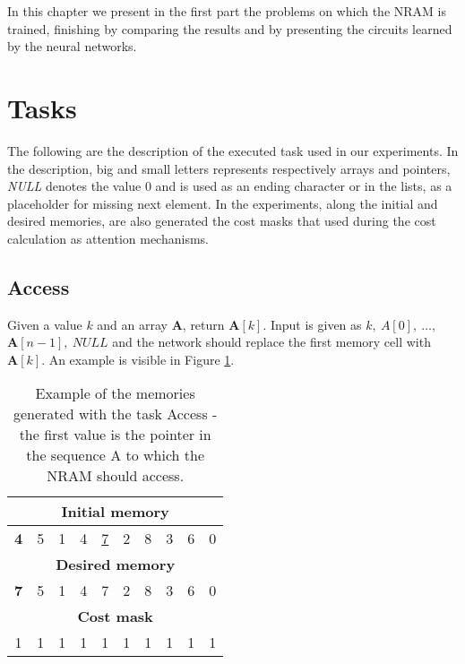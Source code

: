 \label{experiments}
In this chapter we present in the first part the problems on which the NRAM is trained, finishing by comparing the results and by presenting the circuits learned by the neural networks.

\section{Tasks}
The following are the description of the executed task used in our experiments. In the description, big and small letters represents respectively arrays and pointers, \textit{NULL} denotes the value 0 and is used as an ending character or in the lists, as a placeholder for missing next element. In the experiments, along the initial and desired memories, are also generated the cost masks that used during the cost calculation as attention mechanisms.

\subsection{Access}
Given a value $k$ and an array \textbf{A}, return $\textbf{A}[k]$. Input is given as $k,\ A[0],\ \dots,\ $\\$\textbf{A}[n-1],\ \textit{NULL}$ and the network should replace the first memory cell with $\textbf{A}[k]$. An example is visible in Figure \ref{fig:access-example}.
\begin{table}[h!]
	\centering
	\begin{tabular}{|c|c|c|c|c|c|c|c|c|c|}
		\hline
		\multicolumn{10}{|c|}{\textbf{Initial memory}} \\ \hline
		\textbf{4} & 5 & 1 & 4 & \underline{7} & 2 & 8 & 3 & 6 & 0 \\ \hline\hline\hline
		\multicolumn{10}{|c|}{\textbf{Desired memory}} \\ \hline
		\textbf{7} & 5 & 1 & 4 & 7 & 2 & 8 & 3 & 6 & 0 \\ \hline\hline\hline
		\multicolumn{10}{|c|}{\textbf{Cost mask}} \\ \hline
		1 & 1 & 1 & 1 & 1 & 1 & 1 & 1 & 1 & 1 \\ \hline
	\end{tabular}
	\caption{Example of the memories generated with the task Access - the first value is the pointer in the sequence A to which the NRAM should access.}
	\label{fig:access-example}
\end{table}
\FloatBarrier
